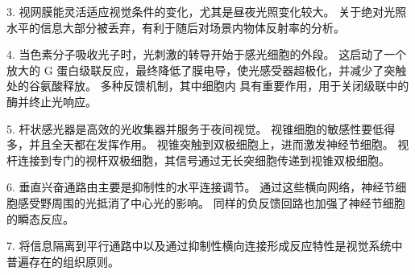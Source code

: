 3. 视网膜能灵活适应视觉条件的变化，尤其是昼夜光照变化较大。
关于绝对光照水平的信息大部分被丢弃，有利于随后对场景内物体反射率的分析。 


4. 当色素分子吸收光子时，光刺激的转导开始于感光细胞的外段。
这启动了一个放大的 G 蛋白级联反应，最终降低了膜电导，使光感受器超极化，并减少了突触处的谷氨酸释放。 
多种反馈机制，其中细胞内  具有重要作用，用于关闭级联中的酶并终止光响应。 


5. 杆状感光器是高效的光收集器并服务于夜间视觉。
视锥细胞的敏感性要低得多，并且全天都在发挥作用。
视锥突触到双极细胞上，进而激发神经节细胞。
视杆连接到专门的视杆双极细胞，其信号通过无长突细胞传递到视锥双极细胞。 


6. 垂直兴奋通路由主要是抑制性的水平连接调节。
通过这些横向网络，神经节细胞感受野周围的光抵消了中心光的影响。
同样的负反馈回路也加强了神经节细胞的瞬态反应。


7. 将信息隔离到平行通路中以及通过抑制性横向连接形成反应特性是视觉系统中普遍存在的组织原则。



